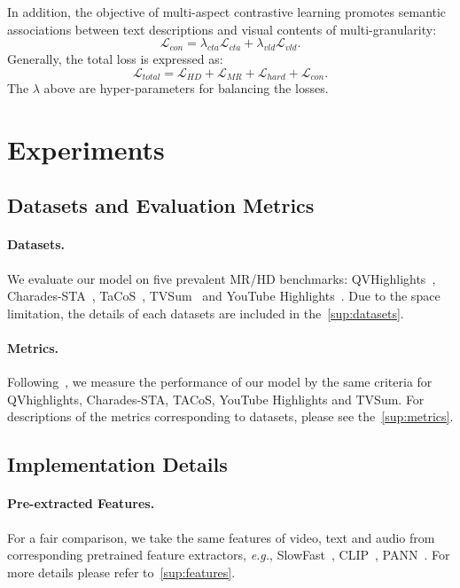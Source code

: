 \noindent In addition, the objective of multi-aspect contrastive learning promotes semantic associations between text descriptions and visual contents of multi-granularity:
\begin{equation}
    \mathcal{L}_{con} = \lambda_{cta}\mathcal{L}_{cta} + \lambda_{vld}\mathcal{L}_{vld}.
\end{equation}
Generally, the total loss is expressed as:
\begin{equation}
    \mathcal{L}_{total} = \mathcal{L}_{HD} + \mathcal{L}_{MR} + \mathcal{L}_{hard} + \mathcal{L}_{con}.
\end{equation}
The $\lambda$ above are hyper-parameters for balancing the losses.\section{Experiments}

\subsection{Datasets and Evaluation Metrics}
\paragraph{Datasets.} We evaluate our model on five prevalent MR/HD benchmarks: QVHighlights~\cite{momentdetr}, Charades-STA~\cite{cha}, TaCoS~\cite{tacos}, TVSum~\cite{tvsum} and YouTube Highlights~\cite{youtubehl}. Due to the space limitation, the details of each datasets are included in the~\cref{sup:datasets}.

\vspace{-7pt}
\paragraph{Metrics.} 
Following~\cite{momentdetr,umt,detr}, we measure the performance of our model by the same criteria for QVhighlights, Charades-STA, TACoS, YouTube Highlights and TVSum. For descriptions of the metrics corresponding to datasets, please see the~\cref{sup:metrics}.

\subsection{Implementation Details}
\paragraph{Pre-extracted Features.} For a fair comparison, we take the same features of video, text and audio from corresponding pretrained feature extractors, \textit{e.g.}, SlowFast~\cite{slowfast}, CLIP~\cite{clip}, PANN~\cite{pann}. For more details please refer to~\cref{sup:features}.


